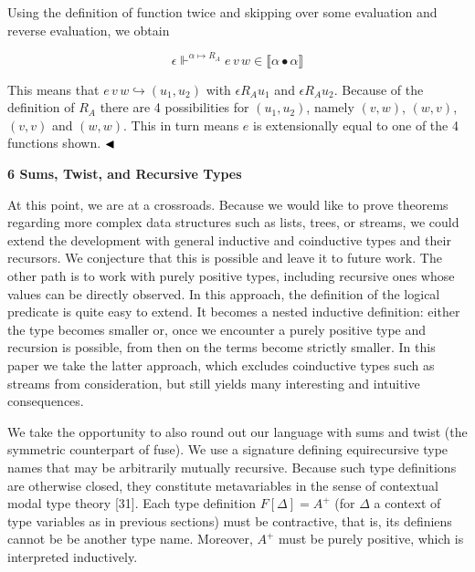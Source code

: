 \documentclass[10pt,a4paper]{amsart}
\begin{document}
Using the definition of function twice and skipping over some evaluation and reverse evaluation, we obtain\par
  
\par  \quad  \[\epsilon\Vdash^{\alpha\mapsto R_{A}}e\,v\,w\in\llbracket\alpha\bullet\alpha\rrbracket\]\quad  \quad  
  
This means that $e\,v\,w\mathrel{\hookrightarrow}(u_{1},u_{2})$ with $\epsilon\mathrel{R_{A}}u_{1}$ and $\epsilon\mathrel{R_{A}}u_{2}$. Because of the definition of $R_{A}$ there are 4 possibilities for $(u_{1},u_{2})$, namely $(v,w)$, $(w,v)$, $(v,v)$ and $(w,w)$. This in turn means $e$ is extensionally equal to one of the 4 functions shown. $\hfill\blacktriangleleft$\par
 
 
 


 
\par\medskip\noindent\textbf{6 Sums, Twist, and Recursive Types}\par
 
 
At this point, we are at a crossroads. Because we would like to prove theorems regarding more complex data structures such as lists, trees, or streams, we could extend the development with general inductive and coinductive types and their recursors. We conjecture that this is possible and leave it to future work. The other path is to work with purely positive types, including recursive ones whose values can be directly observed. In this approach, the definition of the logical predicate is quite easy to extend. It becomes a nested inductive definition: either the type becomes smaller or, once we encounter a purely positive type and recursion is possible, from then on the terms become strictly smaller. In this paper we take the latter approach, which excludes coinductive types such as streams from consideration, but still yields many interesting and intuitive consequences.\par
 
 
 
We take the opportunity to also round out our language with sums and twist (the symmetric counterpart of fuse). We use a signature defining equirecursive type names that may be arbitrarily mutually recursive. Because such type definitions are otherwise closed, they constitute metavariables in the sense of contextual modal type theory [31]. Each type definition $F[\Delta]=A^{+}$ (for $\Delta$ a context of type variables as in previous sections) must be contractive, that is, its definiens cannot be be another type name. Moreover, $A^{+}$ must be purely positive, which is interpreted inductively.\par
  
\end{document}
